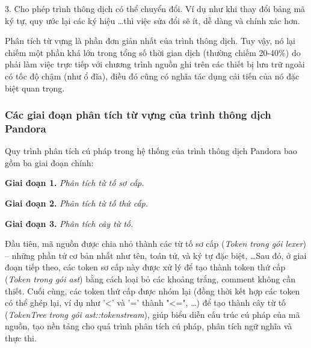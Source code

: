 3. Cho phép trình thông dịch có thể chuyển đổi. Ví dụ như khi thay đổi bảng mã ký tự, quy ước lại các ký hiệu \dots\space thì việc sửa đổi sẽ ít, dễ dàng và chính xác hơn.

Phân tích từ vựng là phần đơn giản nhất của trình thông dịch. Tuy vậy, nó lại chiếm một phần khá lớn trong tổng số thời gian dịch (thường chiếm 20-40\%) do phải làm việc trực tiếp với chương trình nguồn ghi trên các thiết bị lưu trữ ngoài có tốc độ chậm (như ổ đĩa), điều đó cũng có nghĩa tác dụng cải tiến của nó đặc biệt quan trọng.

\subsubsection{Các giai đoạn phân tích từ vựng của trình thông dịch Pandora}
Quy trình phân tích cú pháp trong hệ thống của trình thông dịch Pandora bao gồm ba giai đoạn chính:

\textbf{Giai đoạn 1.} \textit{Phân tích từ tố sơ cấp.}

\textbf{Giai đoạn 2.} \textit{Phân tích từ tố thứ cấp.}

\textbf{Giai đoạn 3.} \textit{Phân tích cây từ tố.}

Đầu tiên, mã nguồn được chia nhỏ thành các từ tố sơ cấp (\textit{Token trong gói lexer}) – những phần tử cơ bản nhất như tên, toán tử, và ký tự đặc biệt, \dots Sau đó, ở giai đoạn tiếp theo, các token sơ cấp này được xử lý để tạo thành token thứ cấp (\textit{Token trong gói ast}) bằng cách loại bỏ các khoảng trắng, comment không cần thiết. Cuối cùng, các token thứ cấp được nhóm lại (đồng thời kết hợp các token có thể ghép lại, ví dụ như '<' và '=' thành "<=", \dots) để tạo thành cây từ tố (\textit{TokenTree trong gói ast::tokenstream}), giúp biểu diễn cấu trúc cú pháp của mã nguồn, tạo nền tảng cho quá trình phân tích cú pháp, phân tích ngữ nghĩa và thực thi. 
